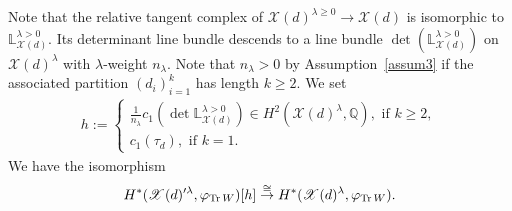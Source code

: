 \documentclass [11pt,oneside,a4paper,mathscr]{amsart}
\theoremstyle{definition}
\renewcommand{\geq}{\geqslant}
\newcommand{\X}{\mathscr{X}}
\newcommand{\Tr}{\mathop{\rm Tr}}
\begin{document}
Note that the relative tangent complex of $\X(d)^{\lambda \geq 0} \to \X(d)$
is isomorphic to $\mathbb{L}_{\X(d)}^{\lambda>0}$. Its determinant 
line bundle descends to a line bundle $\det \left(\mathbb{L}_{\X(d)}^{\lambda>0}\right)$ 
on $\X(d)^{\lambda}$ 
with $\lambda$-weight $n_{\lambda}$. Note that $n_{\lambda}>0$ by 
Assumption~\ref{assum3} if the associated partition $(d_i)_{i=1}^k$ 
has length $k\geq 2$. 
We set
\begin{align*}
    h:=\begin{cases}
        \frac{1}{n_{\lambda}} c_1(\det \mathbb{L}_{\X(d)}^{\lambda>0}) \in 
    H^2(\X(d)^{\lambda}, \mathbb{Q}),\text{ if }k\geq 2,\\
    c_1(\tau_d),\text{ if }k=1.
    \end{cases}
\end{align*}
We have the isomorphism 
\begin{align}\label{isom:h}
    H^{\ast}(\X(d)'^{\lambda}, \varphi_{\Tr W})[h] \stackrel{\cong}{\to}
    H^{\ast}(\X(d)^{\lambda}, \varphi_{\Tr W}). 
\end{align}
\end{document}
